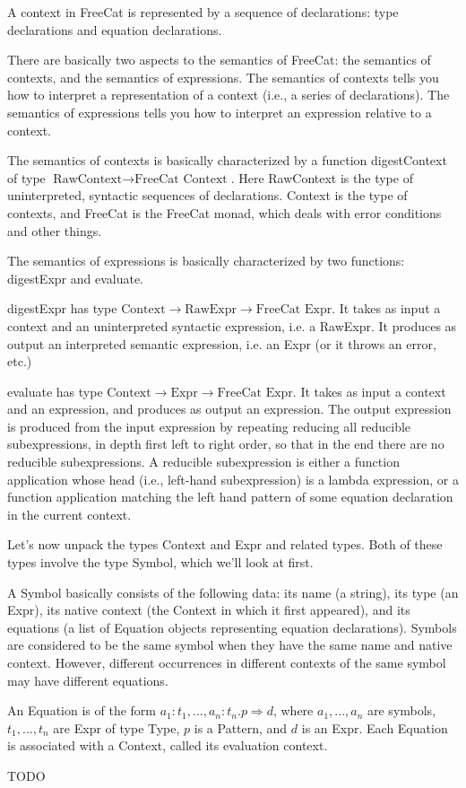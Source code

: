 \documentclass{article}
\begin{document}
A context in FreeCat is represented by a sequence of declarations: type declarations and equation declarations.

There are basically two aspects to the semantics of FreeCat: the semantics of contexts, and the semantics of expressions. The semantics of contexts tells you how to interpret a representation of a context (i.e., a series of declarations). The semantics of expressions tells you how to interpret an expression relative to a context.

The semantics of contexts is basically characterized by a function digestContext of type $\text{RawContext} \to \text{FreeCat Context}$. Here RawContext is the type of uninterpreted, syntactic sequences of declarations. Context is the type of contexts, and FreeCat is the FreeCat monad, which deals with error conditions and other things.

The semantics of expressions is basically characterized by two functions: digestExpr and evaluate.

digestExpr has type $\text{Context} \to \text{RawExpr} \to \text{FreeCat Expr}$. It takes as input a context and an uninterpreted syntactic expression, i.e. a RawExpr. It produces as output an interpreted semantic expression, i.e. an Expr (or it throws an error, etc.)

evaluate has type $\text{Context} \to \text{Expr} \to \text{FreeCat Expr}$. It takes as input a context and an expression, and produces as output an expression. The output expression is produced from the input expression by repeating reducing all reducible subexpressions, in depth first left to right order, so that in the end there are no reducible subexpressions. A reducible subexpression is either a function application whose head (i.e., left-hand subexpression) is a lambda expression, or a function application matching the left hand pattern of some equation declaration in the current context.

Let's now unpack the types Context and Expr and related types. Both of these types involve the type Symbol, which we'll look at first.

A Symbol basically consists of the following data: its name (a string), its type (an Expr), its native context (the Context in which it first appeared), and its equations (a list of Equation objects representing equation declarations). Symbols are considered to be the same symbol when they have the same name and native context. However, different occurrences in different contexts of the same symbol may have different equations.

An Equation is of the form $a_1 : t_1, ..., a_n : t_n. p \Rightarrow d$, where $a_1,...,a_n$ are symbols, $t_1,...,t_n$ are Expr of type Type, $p$ is a Pattern, and $d$ is an Expr. Each Equation is associated with a Context, called its evaluation context.

TODO
\end{document}
